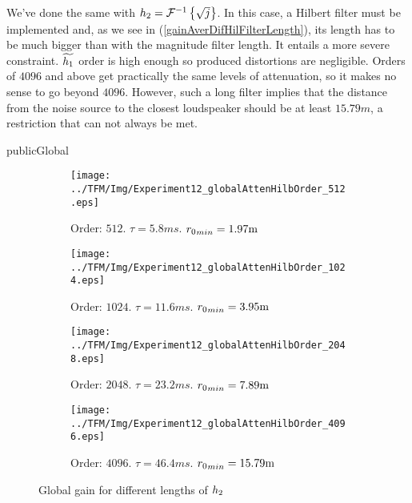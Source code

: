 We've done the same with $\freqFilter[time][phase] = \FourierTransform{\sqrt{j}}[inverse]$. In this case, a Hilbert filter must be implemented and, as we see in (\autoref{gainAverDifHilFilterLength}), its length has to be much bigger than with the magnitude filter length. It entails a more severe constraint. $\widetilde{\freqFilter[time][magnitude]}$ order is high enough so produced distortions are negligible. Orders of $4096$ and above get practically the same levels of attenuation, so it makes no sense to go beyond $4096$. However, such a long filter implies that the distance from the noise source to the closest loudspeaker should be at least $15.79 \si{m}$, a restriction that can not always be met.
\begin{shownto}{publicGlobal}
\begin{figure}[h]
	\centering
	\begin{subfigure}[b]{0.45\textwidth}
		\centering
		\texttt{[image: ../TFM/Img/Experiment12\_globalAttenHilbOrder\_512.eps]}
		\caption{Order: $512$. $\tau = 5.8 \si{ms}$. ${\distLinePrimSource}_{min} = 1.97\si{m}$}
	\end{subfigure}
	\begin{subfigure}[b]{0.45\textwidth}
		\centering
		\texttt{[image: ../TFM/Img/Experiment12\_globalAttenHilbOrder\_1024.eps]}
		\caption{Order: $1024$. $\tau = 11.6 \si{ms}$. ${\distLinePrimSource}_{min} = 3.95\si{m}$}
	\end{subfigure}
	\begin{subfigure}[b]{0.45\textwidth}
		\centering
		\texttt{[image: ../TFM/Img/Experiment12\_globalAttenHilbOrder\_2048.eps]}
		\caption{Order: $2048$. $\tau = 23.2 \si{ms}$. ${\distLinePrimSource}_{min} = 7.89\si{m}$}
	\end{subfigure}
	\begin{subfigure}[b]{0.45\textwidth}
		\centering
		\texttt{[image: ../TFM/Img/Experiment12\_globalAttenHilbOrder\_4096.eps]}
		\caption{Order: $4096$. $\tau = 46.4 \si{ms}$. ${\distLinePrimSource}_{min} = 15.79\si{m}$}
	\end{subfigure}
	
	\caption{Global gain for different lengths of $\freqFilter[time][phase]$}
	\label{globCancDifHilFilterLength}
\end{figure}
\end{shownto}

